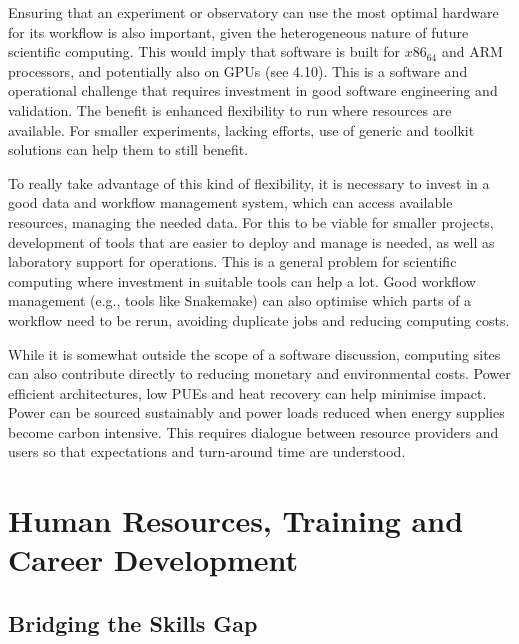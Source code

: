 Ensuring that an experiment or observatory can use the most optimal hardware for its workflow is also important, given the heterogeneous nature of future scientific computing. This would imply that software is built for $x86_64$ and ARM processors, and potentially also on GPUs (see 4.10). This is a software and operational challenge that requires investment in good software engineering and validation. The benefit is enhanced flexibility to run where resources are available. For smaller experiments, lacking efforts, use of generic and toolkit solutions can help them to still benefit.

To really take advantage of this kind of flexibility, it is necessary to invest in a good data and workflow management system, which can access available resources, managing the needed data. For this to be viable for smaller projects, development of tools that are easier to deploy and manage is needed, as well as laboratory support for operations. This is a general problem for scientific computing where investment in suitable tools can help a lot. Good workflow management (e.g., tools like Snakemake) can also optimise which parts of a workflow need to be rerun, avoiding duplicate jobs and reducing computing costs.

While it is somewhat outside the scope of a software discussion, computing sites can also contribute directly to reducing monetary and environmental costs. Power efficient architectures, low PUEs and heat recovery can help minimise impact. Power can be sourced sustainably and power loads reduced when energy supplies become carbon intensive. This requires dialogue between resource providers and users so that expectations and turn-around time are understood.


\section{Human Resources, Training and Career Development}

\subsection{Bridging the Skills Gap}

